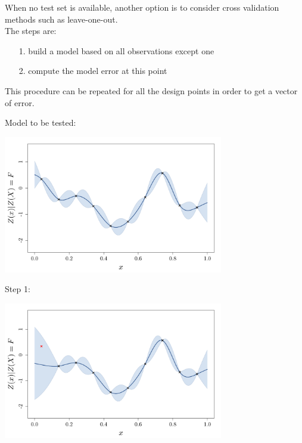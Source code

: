 \begin{frame}{}
When no test set is available, another option is to consider cross validation methods such as leave-one-out. \\ \vspace{5mm}
The steps are:
\begin{enumerate}
	\item[1.] build a model based on all observations except one
	\item[2.] compute the model error at this point
\end{enumerate}
This procedure can be repeated for all the design points in order to get a vector of error.\\ \vspace{3mm}
\end{frame}

\begin{frame}{}
Model to be tested:\\ \vspace{3mm}
\begin{center}
\includegraphics[height=6cm]{3_gaussian_process_regression/figures/R/VALID_crossval0}
\end{center}
\end{frame}

\begin{frame}{}
Step 1:\\ \vspace{3mm}
\begin{center}
\includegraphics[height=6cm]{3_gaussian_process_regression/figures/R/VALID_crossval1}
\end{center}
\end{frame}

